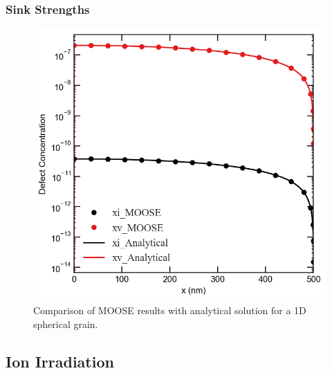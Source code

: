 \documentclass[a4paper]{article}
\begin{document}
    \subsubsection{Sink Strengths}
      \begin{figure}[h!]
        \centering
        \includegraphics[scale=0.6]{concentration_proflies_MOOSE_Analytical_Neutron_0}
        \caption{Comparison of MOOSE results with analytical solution for a 1D spherical grain.\cite{heald1977}}
        \label{figure:6}
      \end{figure}

  \subsection{Ion Irradiation}
\end{document}
